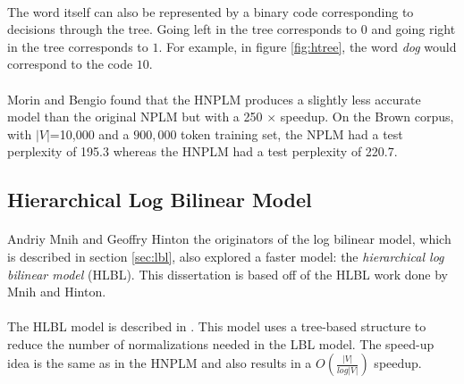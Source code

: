 \paragraph{}
The word itself can also be represented by a binary code corresponding to decisions through the tree. Going left in the tree corresponds to $0$ and going right in the tree corresponds to $1$. For example, in figure \ref{fig:htree}, the word \emph{dog} would correspond to the code $10$.

\paragraph{}
Morin and Bengio found that the HNPLM produces a slightly less accurate model than the original NPLM but with a 250 $\times$ speedup. On the Brown corpus, with $|V|$=10,000 and a $900,000$ token training set, the NPLM had a test perplexity of 195.3 whereas the HNPLM had a test perplexity of 220.7.

\subsection{Hierarchical Log Bilinear Model} \label{sec:HLBL}
\paragraph{}
Andriy Mnih and Geoffry Hinton the originators of the log bilinear model, which is described in section \ref{sec:lbl},  also explored a faster model: the \emph{hierarchical log bilinear model} (HLBL). This dissertation is based off of the HLBL work done by Mnih and Hinton. 

\paragraph{}
The HLBL model is described in \cite{MnihHinton2009}. This model uses a tree-based structure to reduce the number of normalizations needed in the LBL model. The speed-up idea is the same as in the HNPLM and also results in a $O(\frac{|V|}{log|V|})$ speedup.

